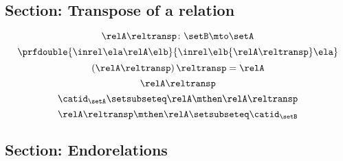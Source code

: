 \begin{forslides}
\subsection{Section: Transpose of a relation}


 \begin{equation}\label{eq:slides_session2_rel_133}
\relA\reltransp\colon \setB \mto \setA
\end{equation}
\begin{equation}\label{eq:slides_session2_rel_134}
\prfdouble{
            \inrel \ela \relA \elb
        }{
            \inrel \elb {\relA\reltransp} \ela
        }
\end{equation}
 \begin{equation}\label{eq:slides_session2_rel_135}
\left(\relA\reltransp\right)\reltransp = \relA 
\end{equation}
\begin{equation}\label{eq:slides_session2_rel_136}
\relA\reltransp
\end{equation}
 \begin{equation}\label{eq:slides_session2_rel_137}
\catid_\setA\setsubseteq \relA \mthen \relA\reltransp
\end{equation}
\begin{equation}\label{eq:slides_session2_rel_138}
\relA\reltransp\mthen \relA\setsubseteq \catid_\setB
\end{equation}

\subsection{Section: Endorelations}


\end{forslides}
